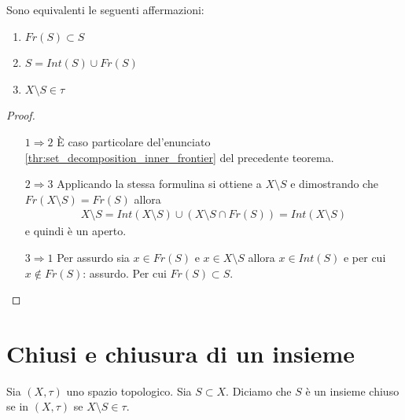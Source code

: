\begin{theorem}
	Sono equivalenti le seguenti affermazioni:
	\begin{enumerate}
		\item $Fr(S) \subset S$
		\item $S = Int(S) \cup Fr(S)$
		\item $X \setminus S \in \tau$ 
	\end{enumerate}
\end{theorem}
\begin{proof}
	\begin{enumerate}
		\item[$1\Rightarrow 2$] È caso particolare del'enunciato \ref{thr:set_decomposition_inner_frontier} del precedente teorema.
		\item[$2 \Rightarrow 3$] Applicando la stessa formulina si ottiene a $X \setminus S$ e dimostrando che $Fr(X\setminus S) = Fr(S)$ allora 
		\begin{equation}
		\begin{aligned}
			X \setminus S = Int(X\setminus S) \cup (X \setminus S \cap Fr(S)) = Int(X \setminus S)
		\end{aligned}
		\end{equation}
		 e quindi è un aperto.
		\item[$3 \Rightarrow 1$] Per assurdo sia $x \in Fr(S)$ e $x \in X \setminus S$ allora $x\in Int(S)$ e per cui $x \notin Fr(S)$: assurdo. Per cui $Fr(S) \subset S$.
	\end{enumerate}
\end{proof}

\section{Chiusi e chiusura di un insieme}

\begin{definition}
	Sia $(X, \tau)$ uno spazio topologico. Sia $S \subset X$. Diciamo che $S$ è un insieme chiuso se in $(X,\tau)$ se $X\setminus S \in \tau$.
\end{definition}

